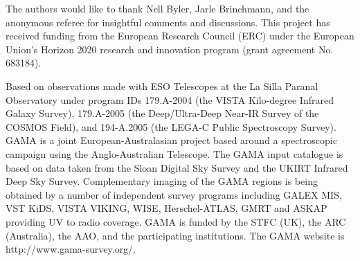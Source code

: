 \documentclass[twocolumn,natbib,iop,hyperref]{aastex62}
\begin{document}
\begin{acknowledgements}

The authors would like to thank Nell Byler, Jarle Brinchmann, and the anonymous referee for insightful comments and discussions.  This project has received funding from the European Research Council (ERC) under the European Union's Horizon 2020 research and innovation program (grant agreement No. 683184).

Based on observations made with ESO Telescopes at the La Silla Paranal Observatory under program IDs 179.A-2004 (the VISTA Kilo-degree Infrared Galaxy Survey), 179.A-2005 (the Deep/Ultra-Deep Near-IR Survey of the COSMOS Field), and 194-A.2005 (the LEGA-C Public Spectroscopy Survey). GAMA is a joint European-Australasian project based around a spectroscopic campaign using the Anglo-Australian Telescope. The GAMA input catalogue is based on data taken from the Sloan Digital Sky Survey and the UKIRT Infrared Deep Sky Survey. Complementary imaging of the GAMA regions is being obtained by a number of independent survey programs including GALEX MIS, VST KiDS, VISTA VIKING, WISE, Herschel-ATLAS, GMRT and ASKAP providing UV to radio coverage. GAMA is funded by the STFC (UK), the ARC (Australia), the AAO, and the participating institutions. The GAMA website is http://www.gama-survey.org/.

\end{acknowledgements}





\end{document}
